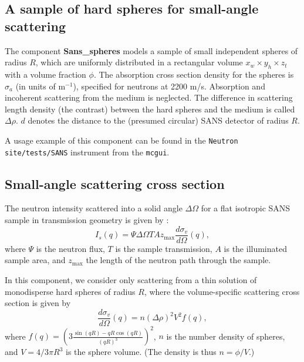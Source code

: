 \subsection*{A sample of hard spheres for small-angle scattering}
\label{sans}


The component \textbf{Sans\_spheres} models a sample of small independent
spheres of radius $R$, which are uniformly distributed
in a rectangular volume $x_w \times y_h \times z_t$ with a volume
fraction $\phi$. The absorption cross section density for the spheres
is $\sigma_a$ (in units of m$^{-1}$), specified
for neutrons at 2200 m/s. Absorption and incoherent scattering
from the medium is neglected.
The difference in scattering length density
(the contrast) between the hard spheres and the medium is called $\Delta \rho$.
$d$ denotes the distance to the (presumed circular) SANS detector of radius $R$.

A usage example of this component can be found in the \verb+Neutron site/tests/SANS+ instrument from the \verb+mcgui+.

\subsection{Small-angle scattering cross section}
The neutron intensity scattered into a solid angle $\Delta \Omega$
for a flat isotropic SANS sample in transmission geometry
is given by \cite{ILLblue}:
\begin{equation}
I_s(q) = \Psi \Delta\Omega T A z_\textrm{max} \frac{d\sigma_v}{d\Omega}(q) ,
\end{equation}
where $\Psi$ is the neutron flux, $T$ is the sample transmission,
$A$ is the illuminated sample area, and $z_\textrm{max}$ the length of
the neutron path through the sample.

In this component, we consider only scattering from a thin solution
of monodisperse hard spheres of radius $R$, where the volume-specific
scattering cross section is given by \cite{ILLblue}
\begin{equation}
\frac{d\sigma_v}{d\Omega}(q) =
  n (\Delta\rho)^2 V^2 f(q)  ,
\end{equation}
where $f(q) = \left( 3\frac{\sin(qR)-qR\cos(qR)}{(qR)^3} \right)^2$,
$n$ is the number density of spheres, and $V = 4 / 3 \pi R^3$ is the
sphere volume. (The density is thus $n = \phi/V$.)

